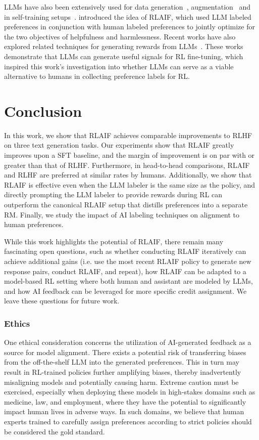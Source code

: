 \documentclass[11pt]{article}
\begin{document}
LLMs have also been extensively used for data generation~\citep{wang2021towards,meng2023tuning}, augmentation~\citep{feng-etal-2021-survey} and in self-training setups~\citep{wang2022self,madaan2023self}. \citet{bai2022constitutional} introduced the idea of RLAIF, which used LLM labeled preferences in conjunction with human labeled preferences to jointly optimize for the two objectives of helpfulness and harmlessness. Recent works have also explored related techniques for generating rewards from LLMs~\citep{roit2023factually,kwon2022reward,yang2023rlcd}. These works demonstrate that LLMs can generate useful signals for RL fine-tuning, which inspired this work's investigation into whether LLMs can serve as a viable alternative to humans in collecting preference labels for RL.

\section{Conclusion}

In this work, we show that RLAIF achieves comparable improvements to RLHF on three text generation tasks. Our experiments show that RLAIF greatly improves upon a SFT baseline, and the margin of improvement is on par with or greater than that of RLHF. Furthermore, in head-to-head comparisons, RLAIF and RLHF are preferred at similar rates by humans. Additionally, we show that RLAIF is effective even when the LLM labeler is the same size as the policy, and directly prompting the LLM labeler to provide rewards during RL can outperform the canonical RLAIF setup that distills preferences into a separate RM. Finally, we study the impact of AI labeling techniques on alignment to human preferences.

While this work highlights the potential of RLAIF, there remain many fascinating open questions, such as whether conducting RLAIF iteratively can achieve additional gains (i.e. use the most recent RLAIF policy to generate new response pairs, conduct RLAIF, and repeat), how RLAIF can be adapted to a model-based RL setting where both human and assistant are modeled by LLMs, and how AI feedback can be leveraged for more specific credit assignment. We leave these questions for future work.


\subsubsection*{Ethics}

One ethical consideration concerns the utilization of AI-generated feedback as a source for model alignment. There exists a potential risk of transferring biases from the off-the-shelf LLM into the generated preferences. This in turn may result in RL-trained policies further amplifying biases, thereby inadvertently misaligning models and potentially causing harm. Extreme caution must be exercised, especially when deploying these models in high-stakes domains such as medicine, law, and employment, where they have the potential to significantly impact human lives in adverse ways. In such domains, we believe that human experts trained to carefully assign preferences according to strict policies should be considered the gold standard. 
\end{document}
